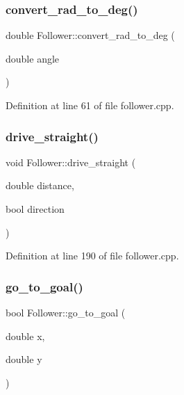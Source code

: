 \mbox{\label{class_follower_a670f07466502e1020514d6ba6b928553}} 
\subsubsection{\texorpdfstring{convert\+\_\+rad\+\_\+to\+\_\+deg()}{convert\_rad\_to\_deg()}}
{\footnotesize\ttfamily double Follower\+::convert\+\_\+rad\+\_\+to\+\_\+deg (\begin{DoxyParamCaption}\item[{double}]{angle }\end{DoxyParamCaption})}



Definition at line 61 of file follower.\+cpp.

\mbox{\label{class_follower_ad4d1ce6f43ce65c0aa5a560247ca55ad}} 
\subsubsection{\texorpdfstring{drive\+\_\+straight()}{drive\_straight()}}
{\footnotesize\ttfamily void Follower\+::drive\+\_\+straight (\begin{DoxyParamCaption}\item[{double}]{distance,  }\item[{bool}]{direction }\end{DoxyParamCaption})}



Definition at line 190 of file follower.\+cpp.

\mbox{\label{class_follower_a08ab05cb32f0e6653939163dd22f344a}} 
\subsubsection{\texorpdfstring{go\+\_\+to\+\_\+goal()}{go\_to\_goal()}}
{\footnotesize\ttfamily bool Follower\+::go\+\_\+to\+\_\+goal (\begin{DoxyParamCaption}\item[{double}]{x,  }\item[{double}]{y }\end{DoxyParamCaption})}



